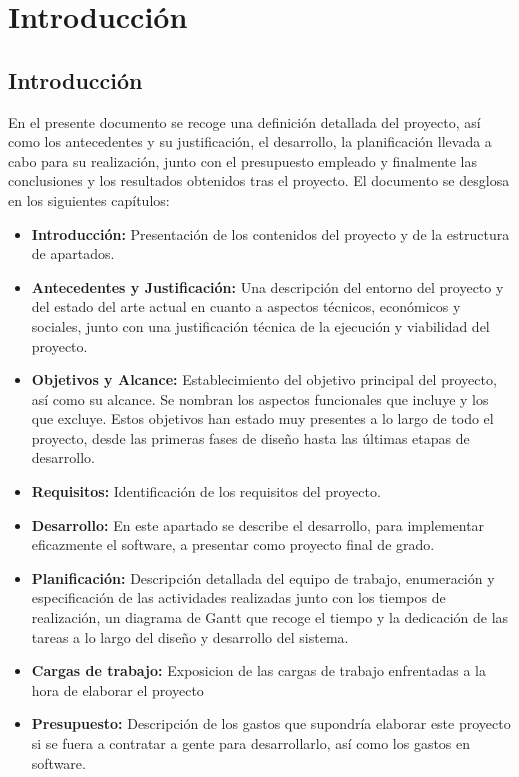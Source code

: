 \chapter{Introducción}\label{Int}
\fancyhf{}%
\fancyfoot[L]{\thepage} 
\section{Introducción}
En el presente documento se recoge una definición detallada del proyecto, así como los antecedentes y su justificación, el desarrollo, la planificación llevada a cabo para su realización, junto con el presupuesto empleado y finalmente las conclusiones y los
resultados obtenidos tras el proyecto. El documento se desglosa en los siguientes capítulos:
\begin{itemize}
    \item \textbf{Introducción: }
    Presentación de los contenidos del proyecto y de la estructura de
apartados.
    \item \textbf{Antecedentes y Justificación: }
    Una descripción del entorno del proyecto y del estado del arte actual en cuanto a aspectos técnicos, económicos y sociales, junto con una justificación técnica de la ejecución y viabilidad del proyecto.
    \item \textbf{Objetivos y Alcance: }
    Establecimiento del objetivo principal del proyecto, así como su alcance. Se nombran los aspectos funcionales que incluye y los que excluye. Estos objetivos han estado muy presentes a lo largo de todo el proyecto, desde las primeras fases de diseño hasta las últimas etapas de desarrollo.
    \item\textbf{Requisitos: }
    Identificación de los requisitos del proyecto.
    \item \textbf{Desarrollo: }
    En este apartado se describe el desarrollo, para implementar eficazmente el software, a presentar como proyecto final de grado.
    \item \textbf{ Planificación: }
    Descripción detallada del equipo de trabajo, enumeración y
especificación de las actividades realizadas junto con los tiempos de realización, un
diagrama de Gantt que recoge el tiempo y la dedicación de las tareas a lo largo del
diseño y desarrollo del sistema.
    \item\textbf{Cargas de trabajo: }
    Exposicion de las cargas de trabajo enfrentadas a la hora de elaborar el proyecto 
    \item\textbf{Presupuesto:}
    Descripción de los gastos que supondría elaborar este proyecto si se fuera a contratar a gente para desarrollarlo, así como los gastos en software.
    

\end{itemize}
